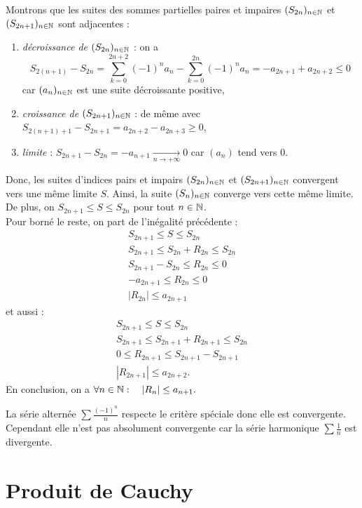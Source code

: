 \documentclass{book}
\begin{document}
\begin{Demonstration}
Montrons que les suites des sommes partielles paires et impaires  $(S_{2n})_{n\in\mathbb{N}}$ et $(S_{2n+1})_{n\in\mathbb{N}}$ sont adjacentes :
\begin{enumerate}
\item \textit{décroissance de $(S_{2n})_{n\in\mathbb{N}}$} : on a $$S_{2(n+1)}-S_{2n}=\sum_{k=0}^{2n+2}(-1)^n a_n -\sum_{k=0}^{2n}(-1)^n a_n =   -a_{2n+1}+a_{2n+2}\leq 0$$ car $(a_n)_{n\in\mathbb{N}}$ est une suite décroissante positive,
\item \textit{croissance de $(S_{2n+1})_{n\in\mathbb{N}}$} : de même avec $S_{2(n+1)+1}-S_{2n+1}=  a_{2n+2}-a_{2n+3}\geq 0$,
\item \textit{limite} : $S_{2n+1}-S_{2n}=-a_{n+1}\xrightarrow[n \to +\infty]{} 0$ car $(a_n)$ tend vers 0.
\end{enumerate}
Donc, les suites d'indices pairs et impairs $(S_{2n})_{n\in\mathbb{N}}$ et $(S_{2n+1})_{n\in\mathbb{N}}$ convergent vers une même limite $S$. Ainsi, la suite $(S_{n})_{n\in\mathbb{N}}$ converge vers cette même limite.\\
De plus, on   $S_{2n+1}\leq S \leq S_{2n}$ pour tout $n\in\mathbb{N}$.\\
Pour borné le reste, on part de l'inégalité précédente :
$$\begin{aligned}
S_{2n+1}\leq S \leq S_{2n}\\
S_{2n+1}\leq S_{2n}+R_{2n} \leq S_{2n}\\
S_{2n+1}-S_{2n}\leq R_{2n} \leq 0\\
-a_{2n+1}\leq R_{2n} \leq 0\\
| R_{2n}|\leq a_{2n+1}
\end{aligned}$$
et aussi :
$$\begin{aligned}
S_{2n+1}\leq S \leq S_{2n}\\
S_{2n+1}\leq S_{2n+1}+R_{2n+1} \leq S_{2n}\\
0\leq R_{2n+1} \leq S_{2n+1}-S_{2n+1}\\
| R_{2n+1}|\leq a_{2n+2}.
\end{aligned}$$
En conclusion, on a $\forall n\in \mathbb{N} : \quad  |R_n|\leq a_{n+1}.$
\end{Demonstration}
\begin{Exemple}
La série alternée $\sum \frac{(-1)^n}{n}$ respecte le critère spéciale donc elle est convergente. Cependant elle n'est pas absolument convergente car la série harmonique $\sum\frac1n$ est divergente.
\end{Exemple}

\section{Produit de Cauchy}
\end{document}
